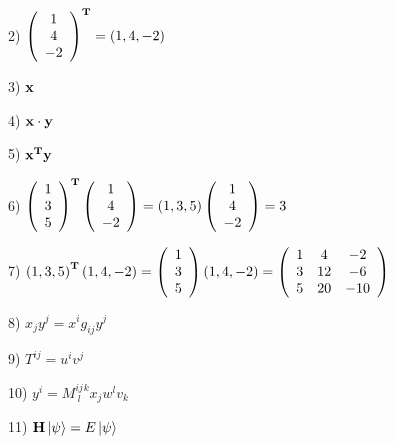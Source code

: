 \documentclass{llncs}
\def\ket#1{\mathinner{|{#1}\rangle}}
\begin{document}
2) $\left( {\begin{array}{*{20}c}
   1   \\
   4   \\
  {-2} \\
 \end{array} } \right)^{\bf T}
= \left( 1, 4, -2 \right)$

3)  ${\bf x}$

4) ${\bf x} \cdot {\bf y}$

5) ${\bf x}^{\bf T}{\bf y}$

6) $\left( {\begin{array}{*{20}c}
   1 \\
   3 \\
   5 \\
\end{array} } \right)^{\bf T}
\left( {\begin{array}{*{20}c}
   1   \\
   4   \\
  {-2} \\
\end{array} } \right)
 = \left( 1, 3, 5 \right) 
\left( {\begin{array}{*{20}c}
   1   \\
   4   \\
  {-2} \\
\end{array} } \right) = 3$

7) $\left( 1, 3, 5 \right)^{\bf T} \left( 1, 4, -2 \right)
 =  
\left( {\begin{array}{*{20}c}
   1  \\
   3  \\
   5  \\
\end{array} } \right) \left( 1, 4, -2 \right) =
\left( {\begin{array}{*{20}c}
   1 & 4 & {-2}    \\
   3 & 12 & {-6}  \\
   5 & 20 & {-10} \\
 \end{array} } \right)$

8) $x_j y^j = x^ig_{ij}y^j$

9) $T^{ij} = u^i v^j$

10) $y^i = M^{ij \hspace{1pt} k}_{\hspace{3pt} l}x_jw^lv_k$

11) ${\bf H}  \ket{\psi} = E \ket{\psi}$
\end{document}
